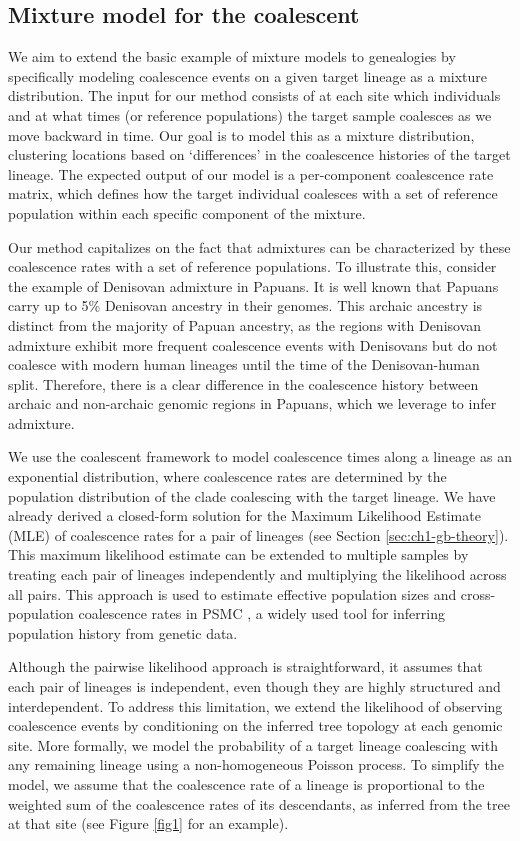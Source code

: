 \subsection{Mixture model for the coalescent}
\label{the_model}
We aim to extend the basic example of mixture models to genealogies by specifically modeling coalescence events on a given target lineage as a mixture distribution. The input for our method consists of at each site which individuals and at what times (or reference populations) the target sample coalesces as we move backward in time. Our goal is to model this as a mixture distribution, clustering locations based on `differences' in the coalescence histories of the target lineage. The expected output of our model is a per-component coalescence rate matrix, which defines how the target individual coalesces with a set of reference population within each specific component of the mixture.

Our method capitalizes on the fact that admixtures can be characterized by these coalescence rates with a set of reference populations. To illustrate this, consider the example of Denisovan admixture in Papuans. It is well known that Papuans carry up to 5\% Denisovan ancestry in their genomes. This archaic ancestry is distinct from the majority of Papuan ancestry, as the regions with Denisovan admixture exhibit more frequent coalescence events with Denisovans but do not coalesce with modern human lineages until the time of the Denisovan-human split. Therefore, there is a clear difference in the coalescence history between archaic and non-archaic genomic regions in Papuans, which we leverage to infer admixture.

We use the coalescent framework to model coalescence times along a lineage as an exponential distribution, where coalescence rates are determined by the population distribution of the clade coalescing with the target lineage. We have already derived a closed-form solution for the Maximum Likelihood Estimate (MLE) of coalescence rates for a pair of lineages (see Section \ref{sec:ch1-gb-theory}). This maximum likelihood estimate can be extended to multiple samples by treating each pair of lineages independently and multiplying the likelihood across all pairs. This approach is used to estimate effective population sizes and cross-population coalescence rates in PSMC \cite{li2011inference}, a widely used tool for inferring population history from genetic data. 

Although the pairwise likelihood approach is straightforward, it assumes that each pair of lineages is independent, even though they are highly structured and interdependent. To address this limitation, we extend the likelihood of observing coalescence events by conditioning on the inferred tree topology at each genomic site. More formally, we model the probability of a target lineage coalescing with any remaining lineage using a non-homogeneous Poisson process. To simplify the model, we assume that the coalescence rate of a lineage is proportional to the weighted sum of the coalescence rates of its descendants, as inferred from the tree at that site (see Figure \ref{fig1} for an example).

